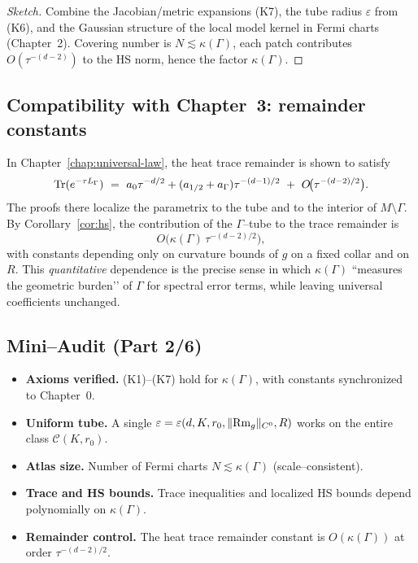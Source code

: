 \begin{proof}[Sketch]
Combine the Jacobian/metric expansions (K7), the tube radius $\varepsilon$ from (K6),
and the Gaussian structure of the local model kernel in Fermi charts (Chapter~2).
Covering number is $N\lesssim \kappa(\Gamma)$, each patch contributes $O(\tau^{-(d-2)})$ to the HS norm, hence the factor $\kappa(\Gamma)$.
\end{proof}

\subsection{Compatibility with Chapter~3: remainder constants}
\label{subsec:compat-ch3}

In Chapter~\ref{chap:universal-law}, the heat trace remainder is shown to satisfy
\[
\Tr(e^{-\tau L_\Gamma})\ =\ a_0\tau^{-d/2}+(a_{1/2}+a_\Gamma)\tau^{-(d-1)/2}\ +\ O\!\big(\tau^{-(d-2)/2}\big).
\]
The proofs there localize the parametrix to the tube and to the interior of $M\setminus\Gamma$.
By Corollary~\ref{cor:hs}, the contribution of the $\Gamma$–tube to the trace remainder is
\[
O\!\big(\kappa(\Gamma)\,\tau^{-(d-2)/2}\big),
\]
with constants depending only on curvature bounds of $g$ on a fixed collar and on $R$.
This \emph{quantitative} dependence is the precise sense in which $\kappa(\Gamma)$ “measures the geometric burden’’ of $\Gamma$ for spectral error terms, while leaving universal coefficients unchanged.

\subsection{Mini–Audit (Part 2/6)}
\label{sec:audit-part2}

\begin{itemize}
\item \textbf{Axioms verified.} (K1)–(K7) hold for $\kappa(\Gamma)$, with constants synchronized to Chapter~0.
\item \textbf{Uniform tube.} A single $\varepsilon=\varepsilon(d,K,r_0,\|{\rm Rm}_g\|_{C^0},R)$ works on the entire class $\mathcal{C}(K,r_0)$.
\item \textbf{Atlas size.} Number of Fermi charts $N\lesssim \kappa(\Gamma)$ (scale–consistent).
\item \textbf{Trace and HS bounds.} Trace inequalities and localized HS bounds depend polynomially on $\kappa(\Gamma)$.
\item \textbf{Remainder control.} The heat trace remainder constant is $O(\kappa(\Gamma))$ at order $\tau^{-(d-2)/2}$.
\end{itemize}

